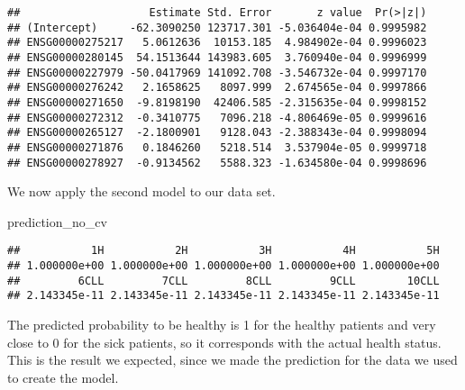 \documentclass[]{article}
\newenvironment{Shaded}{\begin{snugshade}}{\end{snugshade}}
\newcommand{\NormalTok}[1]{#1}
\begin{document}
\begin{verbatim}
##                    Estimate Std. Error       z value  Pr(>|z|)
## (Intercept)     -62.3090250 123717.301 -5.036404e-04 0.9995982
## ENSG00000275217   5.0612636  10153.185  4.984902e-04 0.9996023
## ENSG00000280145  54.1513644 143983.605  3.760940e-04 0.9996999
## ENSG00000227979 -50.0417969 141092.708 -3.546732e-04 0.9997170
## ENSG00000276242   2.1658625   8097.999  2.674565e-04 0.9997866
## ENSG00000271650  -9.8198190  42406.585 -2.315635e-04 0.9998152
## ENSG00000272312  -0.3410775   7096.218 -4.806469e-05 0.9999616
## ENSG00000265127  -2.1800901   9128.043 -2.388343e-04 0.9998094
## ENSG00000271876   0.1846260   5218.514  3.537904e-05 0.9999718
## ENSG00000278927  -0.9134562   5588.323 -1.634580e-04 0.9998696
\end{verbatim}

We now apply the second model to our data set.

\begin{Shaded}
\begin{Highlighting}[]
\NormalTok{prediction_no_cv}
\end{Highlighting}
\end{Shaded}

\begin{verbatim}
##           1H           2H           3H           4H           5H 
## 1.000000e+00 1.000000e+00 1.000000e+00 1.000000e+00 1.000000e+00 
##         6CLL         7CLL         8CLL         9CLL        10CLL 
## 2.143345e-11 2.143345e-11 2.143345e-11 2.143345e-11 2.143345e-11
\end{verbatim}

The predicted probability to be healthy is 1 for the healthy patients
and very close to 0 for the sick patients, so it corresponds with the
actual health status. This is the result we expected, since we made the
prediction for the data we used to create the model.
\end{document}
